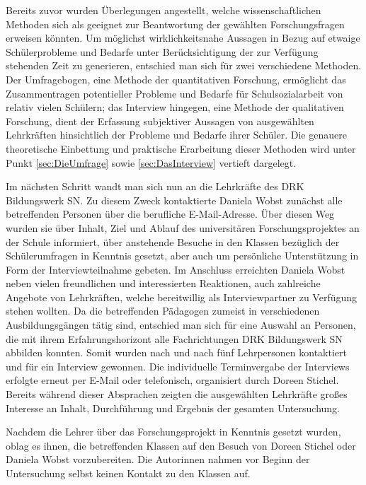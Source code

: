 Bereits zuvor wurden Überlegungen angestellt, welche wissenschaftlichen Methoden sich als geeignet zur Beantwortung der gewählten Forschungsfragen erweisen könnten. Um möglichst wirklichkeitsnahe Aussagen in Bezug auf etwaige Schülerprobleme und Bedarfe unter Berücksichtigung der zur Verfügung stehenden Zeit zu generieren, entschied man sich für zwei verschiedene Methoden. Der Umfragebogen, eine Methode der quantitativen Forschung, ermöglicht das Zusammentragen potentieller Probleme und Bedarfe für Schulsozialarbeit von relativ vielen Schülern; das Interview hingegen, eine Methode der qualitativen Forschung, dient der Erfassung subjektiver Aussagen von ausgewählten Lehrkräften hinsichtlich der Probleme und Bedarfe ihrer Schüler. Die genauere theoretische Einbettung und praktische Erarbeitung dieser Methoden wird unter Punkt \ref{sec:DieUmfrage} sowie \ref{sec:DasInterview} vertieft dargelegt.

Im nächsten Schritt wandt man sich nun an die Lehrkräfte des DRK Bildungswerk SN. Zu diesem Zweck kontaktierte Daniela Wobst zunächst alle betreffenden Personen über die berufliche E-Mail-Adresse. Über diesen Weg wurden sie über Inhalt, Ziel und Ablauf des universitären Forschungsprojektes an der Schule informiert, über anstehende Besuche in den Klassen bezüglich der Schülerumfragen in Kenntnis gesetzt, aber auch um persönliche Unterstützung in Form der Interviewteilnahme gebeten. Im Anschluss erreichten Daniela Wobst neben vielen freundlichen und interessierten Reaktionen, auch zahlreiche Angebote von Lehrkräften, welche bereitwillig als Interviewpartner zu Verfügung stehen wollten. Da die betreffenden Pädagogen zumeist in verschiedenen Ausbildungsgängen tätig sind, entschied man sich für eine Auswahl an Personen, die mit ihrem Erfahrungshorizont alle Fachrichtungen DRK Bildungswerk SN abbilden konnten. Somit wurden nach und nach fünf Lehrpersonen kontaktiert und für ein Interview gewonnen. Die individuelle Terminvergabe der Interviews erfolgte erneut per E-Mail oder telefonisch, organisiert durch Doreen Stichel. Bereits während dieser Absprachen zeigten die ausgewählten Lehrkräfte großes Interesse an Inhalt, Durchführung und Ergebnis der gesamten Untersuchung.

Nachdem die Lehrer über das Forschungsprojekt in Kenntnis gesetzt wurden, oblag es ihnen, die betreffenden Klassen auf den Besuch von Doreen Stichel oder Daniela Wobst vorzubereiten. Die Autorinnen nahmen vor Beginn der Untersuchung selbst keinen Kontakt zu den Klassen auf.

